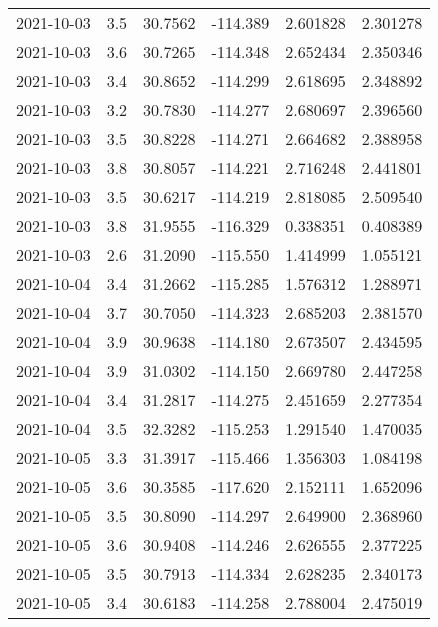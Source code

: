 \begin{tabular}{lrrrrr}
2021-10-03 &       3.5 &  30.7562 &  -114.389 &         2.601828 &         2.301278 \\
2021-10-03 &       3.6 &  30.7265 &  -114.348 &         2.652434 &         2.350346 \\
2021-10-03 &       3.4 &  30.8652 &  -114.299 &         2.618695 &         2.348892 \\
2021-10-03 &       3.2 &  30.7830 &  -114.277 &         2.680697 &         2.396560 \\
2021-10-03 &       3.5 &  30.8228 &  -114.271 &         2.664682 &         2.388958 \\
2021-10-03 &       3.8 &  30.8057 &  -114.221 &         2.716248 &         2.441801 \\
2021-10-03 &       3.5 &  30.6217 &  -114.219 &         2.818085 &         2.509540 \\
2021-10-03 &       3.8 &  31.9555 &  -116.329 &         0.338351 &         0.408389 \\
2021-10-03 &       2.6 &  31.2090 &  -115.550 &         1.414999 &         1.055121 \\
2021-10-04 &       3.4 &  31.2662 &  -115.285 &         1.576312 &         1.288971 \\
2021-10-04 &       3.7 &  30.7050 &  -114.323 &         2.685203 &         2.381570 \\
2021-10-04 &       3.9 &  30.9638 &  -114.180 &         2.673507 &         2.434595 \\
2021-10-04 &       3.9 &  31.0302 &  -114.150 &         2.669780 &         2.447258 \\
2021-10-04 &       3.4 &  31.2817 &  -114.275 &         2.451659 &         2.277354 \\
2021-10-04 &       3.5 &  32.3282 &  -115.253 &         1.291540 &         1.470035 \\
2021-10-05 &       3.3 &  31.3917 &  -115.466 &         1.356303 &         1.084198 \\
2021-10-05 &       3.6 &  30.3585 &  -117.620 &         2.152111 &         1.652096 \\
2021-10-05 &       3.5 &  30.8090 &  -114.297 &         2.649900 &         2.368960 \\
2021-10-05 &       3.6 &  30.9408 &  -114.246 &         2.626555 &         2.377225 \\
2021-10-05 &       3.5 &  30.7913 &  -114.334 &         2.628235 &         2.340173 \\
2021-10-05 &       3.4 &  30.6183 &  -114.258 &         2.788004 &         2.475019 \\

\end{tabular}
